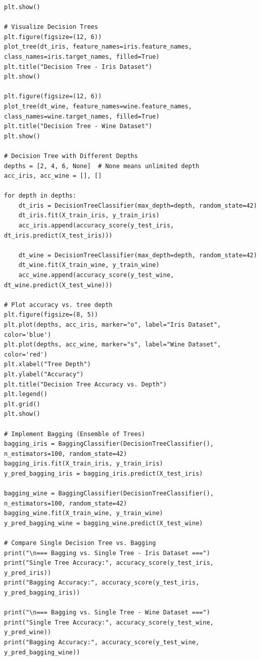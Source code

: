 \documentclass[a4paper,12pt]{article}
\begin{document}
\begin{lstlisting}[style=python]
plt.show()

# Visualize Decision Trees
plt.figure(figsize=(12, 6))
plot_tree(dt_iris, feature_names=iris.feature_names, class_names=iris.target_names, filled=True)
plt.title("Decision Tree - Iris Dataset")
plt.show()

plt.figure(figsize=(12, 6))
plot_tree(dt_wine, feature_names=wine.feature_names, class_names=wine.target_names, filled=True)
plt.title("Decision Tree - Wine Dataset")
plt.show()

# Decision Tree with Different Depths
depths = [2, 4, 6, None]  # None means unlimited depth
acc_iris, acc_wine = [], []

for depth in depths:
    dt_iris = DecisionTreeClassifier(max_depth=depth, random_state=42)
    dt_iris.fit(X_train_iris, y_train_iris)
    acc_iris.append(accuracy_score(y_test_iris, dt_iris.predict(X_test_iris)))

    dt_wine = DecisionTreeClassifier(max_depth=depth, random_state=42)
    dt_wine.fit(X_train_wine, y_train_wine)
    acc_wine.append(accuracy_score(y_test_wine, dt_wine.predict(X_test_wine)))

# Plot accuracy vs. tree depth
plt.figure(figsize=(8, 5))
plt.plot(depths, acc_iris, marker="o", label="Iris Dataset", color='blue')
plt.plot(depths, acc_wine, marker="s", label="Wine Dataset", color='red')
plt.xlabel("Tree Depth")
plt.ylabel("Accuracy")
plt.title("Decision Tree Accuracy vs. Depth")
plt.legend()
plt.grid()
plt.show()

# Implement Bagging (Ensemble of Trees)
bagging_iris = BaggingClassifier(DecisionTreeClassifier(), n_estimators=100, random_state=42)
bagging_iris.fit(X_train_iris, y_train_iris)
y_pred_bagging_iris = bagging_iris.predict(X_test_iris)

bagging_wine = BaggingClassifier(DecisionTreeClassifier(), n_estimators=100, random_state=42)
bagging_wine.fit(X_train_wine, y_train_wine)
y_pred_bagging_wine = bagging_wine.predict(X_test_wine)

# Compare Single Decision Tree vs. Bagging
print("\n=== Bagging vs. Single Tree - Iris Dataset ===")
print("Single Tree Accuracy:", accuracy_score(y_test_iris, y_pred_iris))
print("Bagging Accuracy:", accuracy_score(y_test_iris, y_pred_bagging_iris))

print("\n=== Bagging vs. Single Tree - Wine Dataset ===")
print("Single Tree Accuracy:", accuracy_score(y_test_wine, y_pred_wine))
print("Bagging Accuracy:", accuracy_score(y_test_wine, y_pred_bagging_wine))


\end{lstlisting}
\end{document}
